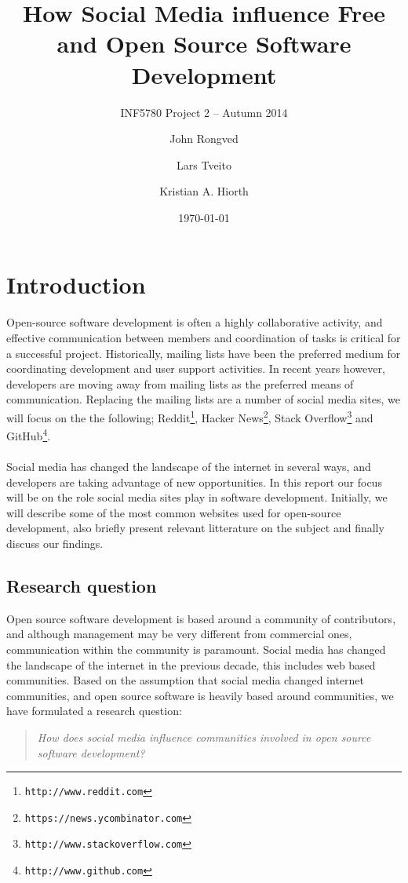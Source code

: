 \documentclass[a4paper,11pt]{article} %
\title{How Social Media influence Free and Open Source Software Development}
\subtitle{INF5780 Project 2 -- Autumn 2014}
\date{\today}
\author{John Rongved \and Lars Tveito \and Kristian A. Hiorth}
\begin{document}
\ififorside{}

\tableofcontents{}
\newpage
\section{Introduction}

Open-source software development is often a highly collaborative activity, and effective communication 
between members and coordination of tasks is critical for a successful project. 
Historically, mailing lists have been the preferred medium for coordinating development
and user support activities\cite{Vasilescu14StackOverflow}. In recent years however, 
developers are moving away from mailing lists as the preferred means of communication.
Replacing the mailing lists are a number of social media sites, we will focus on the the following;
Reddit\footnote{\texttt{http://www.reddit.com}}, Hacker News\footnote{\texttt{https://news.ycombinator.com}},
Stack Overflow\footnote{\texttt{http://www.stackoverflow.com}} and GitHub\footnote{\texttt{http://www.github.com}}.
\\\\Social media has changed the landscape of the internet in several ways, and developers are taking advantage of new opportunities. In this report our focus will be on the role social
media sites play in software development. Initially, we will describe some of the most common
websites used for open-source development, also briefly present relevant 
litterature on the subject and finally discuss our findings.

\subsection{Research question}

Open source software development is based around a community of contributors, and although
management may be very different from commercial ones, communication within the community is paramount.
Social media has changed the landscape of the internet in the previous decade\cite{Kaplan201059}, this includes web based communities. Based on the assumption that social media changed internet communities, and open source
software is heavily based around communities, we have formulated a research question:
\begin{quote}
\textit{How does social media influence communities involved in open source software development?}
\end{quote}
\end{document}
